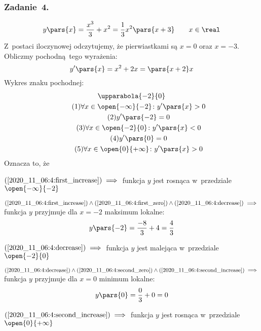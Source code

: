 \subsubsection*{Zadanie~4.}
\begin{equation*}
    y\pars{x} = \frac{x^3}{3} + x^2 = \frac{1}{3}x^2\pars{x + 3} \qquad x \in \real
\end{equation*}
Z~postaci iloczynowej odczytujemy, że pierwiastkami są \(x = 0\) oraz \(x = -3\). Obliczmy pochodną tego wyrażenia:
\begin{equation*}
    y'\pars{x} = x^2 + 2x = \pars{x + 2}x
\end{equation*}
Wykres znaku pochodnej:
\begin{gather*}
    \upparabola{-2}{0}\\
    \tag{\(1\)} \forall x \in \open{-\infty}{-2}\colon y'\pars{x} > 0 \label{2020_11_06:4:first_increase}\\
    \tag{\(2\)} y'\pars{-2} = 0 \label{2020_11_06:4:first_zero}\\
    \tag{\(3\)} \forall x \in \open{-2}{0}\colon y'\pars{x} < 0 \label{2020_11_06:4:decrease}\\
    \tag{\(4\)} y'\pars{0} = 0 \label{2020_11_06:4:second_zero}\\
    \tag{\(5\)} \forall x \in \open{0}{+\infty}\colon y'\pars{x} > 0 \label{2020_11_06:4:second_increase}
\end{gather*}
Oznacza to, że
\begin{description}
    \item \(\mbox{(\ref{2020_11_06:4:first_increase})} \implies\) funkcja \(y\) jest rosnąca w~przedziale \(\open{-\infty}{-2}\)
    \item \(\mbox{(\ref{2020_11_06:4:first_increase})} \land \mbox{(\ref{2020_11_06:4:first_zero})} \land \mbox{(\ref{2020_11_06:4:decrease})} \implies\) funkcja \(y\) przyjmuje dla \(x = -2\) maksimum lokalne:
        \begin{equation*}
            y\pars{-2} = \frac{-8}{3} + 4 = \frac{4}{3}
        \end{equation*}
    \item \(\mbox{(\ref{2020_11_06:4:decrease})} \implies\) funkcja \(y\) jest malejąca w~przedziale \(\open{-2}{0}\)
    \item \(\mbox{(\ref{2020_11_06:4:decrease})} \land \mbox{(\ref{2020_11_06:4:second_zero})} \land \mbox{(\ref{2020_11_06:4:second_increase})} \implies\) funkcja \(y\) przyjmuje dla \(x = 0\) minimum lokalne:
        \begin{equation*}
            y\pars{0} = \frac{0}{3} + 0 = 0
        \end{equation*}
    \item \(\mbox{(\ref{2020_11_06:4:second_increase})} \implies\) funkcja \(y\) jest rosnąca w~przedziale \(\open{0}{+\infty}\)
\end{description}
